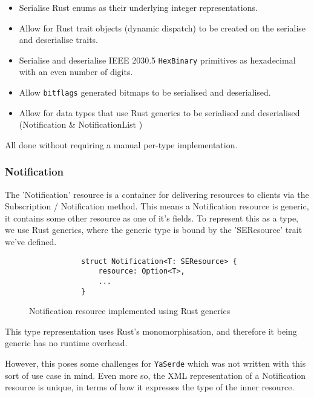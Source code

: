 \begin{itemize}
    \item Serialise Rust enums as their underlying integer representations.
    \item Allow for Rust trait objects (dynamic dispatch) to be created on the serialise and deserialise traits.
    \item Serialise and deserialise IEEE 2030.5 \texttt{HexBinary} primitives as hexadecimal with an even number of digits. 
    \item Allow \texttt{bitflags} generated bitmaps to be serialised and deserialised.
    \item Allow for data types that use Rust generics to be serialised and deserialised (Notification \& NotificationList )
\end{itemize}

All done without requiring a manual per-type implementation.

\subsubsection{Notification}
The 'Notification' resource is a container for delivering resources to clients via the Subscription / Notification method. This means a Notification resource is generic, it contains some other resource as one of it's fields. To represent this as a type, we use Rust generics, where the generic type is bound by the 'SEResource' trait we've defined.

\begin{figure}[H]
    \begin{center}
        \begin{lstlisting}
            struct Notification<T: SEResource> {
                resource: Option<T>,
                ...
            }
        \end{lstlisting}
        \label{fig:notifgeneric}
        \caption{Notification resource implemented using Rust generics}
    \end{center}
\end{figure}

This type representation uses Rust's monomorphisation, and therefore it being generic has no runtime overhead.

However, this poses some challenges for \texttt{YaSerde} which was not written with this sort of use case in mind. Even more so, the XML representation of a Notification resource is unique, in terms of how it expresses the type of the inner resource.


